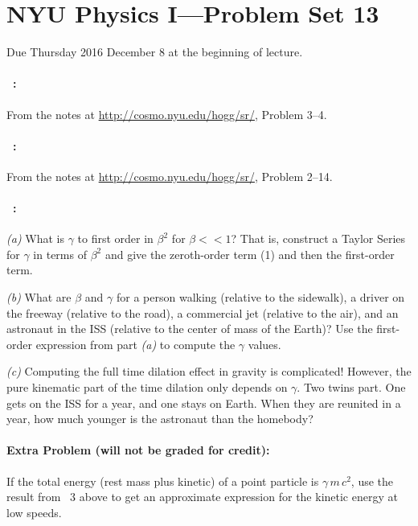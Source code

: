 \documentclass[12pt]{article}
\begin{document}
\section*{NYU Physics I---Problem Set 13}

Due Thursday 2016 December 8 at the beginning of lecture.

\paragraph{\problemname~\theproblem:}%
From the notes at \url{http://cosmo.nyu.edu/hogg/sr/},
Problem 3--4.

\paragraph{\problemname~\theproblem:}%
From the notes at \url{http://cosmo.nyu.edu/hogg/sr/},
Problem 2--14.

\paragraph{\problemname~\theproblem:}%
\textsl{(a)} What is $\gamma$ to first order in $\beta^2$ for $\beta
<< 1$? That is, construct a Taylor Series for $\gamma$ in terms of
$\beta^2$ and give the zeroth-order term (1) and then the first-order
term.

\textsl{(b)} What are $\beta$ and $\gamma$ for a person walking
(relative to the sidewalk), a driver on the freeway (relative to the
road), a commercial jet (relative to the air), and an astronaut in the
ISS (relative to the center of mass of the Earth)? Use the first-order
expression from part \textsl{(a)} to compute the $\gamma$ values.

\textsl{(c)} Computing the full time dilation effect in gravity is
complicated! However, the pure kinematic part of the time dilation
only depends on $\gamma$. Two twins part. One gets on the ISS for a
year, and one stays on Earth. When they are reunited in a year, how
much younger is the astronaut than the homebody?

\paragraph{Extra Problem (will not be graded for credit):}%
If the total energy (rest mass plus kinetic) of a point particle is
$\gamma\,m\,c^2$, use the result from \problemname~3 above to get an
approximate expression for the kinetic energy at low speeds.
\end{document}
